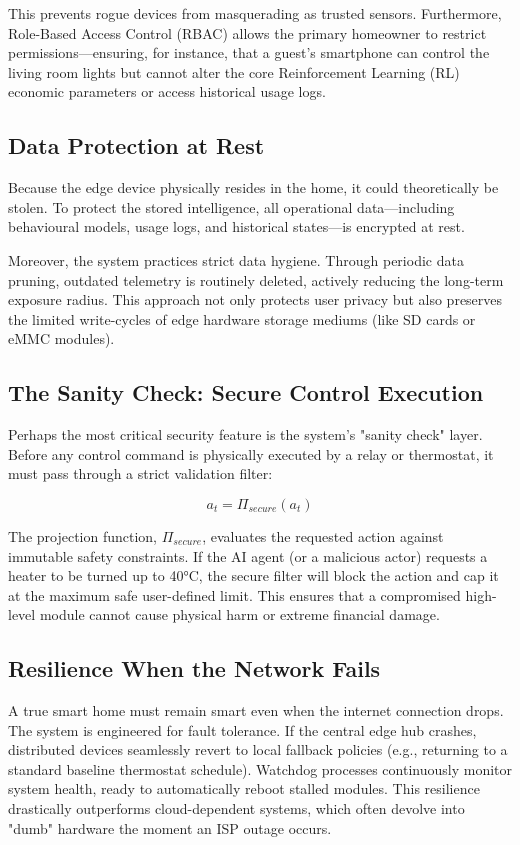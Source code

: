 \documentclass[11pt,a4paper]{article}
\begin{document}
This prevents rogue devices from masquerading as trusted sensors. Furthermore, Role-Based Access Control (RBAC) allows the primary homeowner to restrict permissions---ensuring, for instance, that a guest's smartphone can control the living room lights but cannot alter the core Reinforcement Learning (RL) economic parameters or access historical usage logs.

\subsection{Data Protection at Rest}

Because the edge device physically resides in the home, it could theoretically be stolen. To protect the stored intelligence, all operational data---including behavioural models, usage logs, and historical states---is encrypted at rest.

Moreover, the system practices strict data hygiene. Through periodic data pruning, outdated telemetry is routinely deleted, actively reducing the long-term exposure radius. This approach not only protects user privacy but also preserves the limited write-cycles of edge hardware storage mediums (like SD cards or eMMC modules).

\subsection{The Sanity Check: Secure Control Execution}

Perhaps the most critical security feature is the system's "sanity check" layer. Before any control command is physically executed by a relay or thermostat, it must pass through a strict validation filter:

$$
a_t = \Pi_{secure}(a_t)
$$

The projection function, $\Pi_{secure}$, evaluates the requested action against immutable safety constraints. If the AI agent (or a malicious actor) requests a heater to be turned up to 40°C, the secure filter will block the action and cap it at the maximum safe user-defined limit. This ensures that a compromised high-level module cannot cause physical harm or extreme financial damage.

\subsection{Resilience When the Network Fails}

A true smart home must remain smart even when the internet connection drops. The system is engineered for fault tolerance. If the central edge hub crashes, distributed devices seamlessly revert to local fallback policies (e.g., returning to a standard baseline thermostat schedule). Watchdog processes continuously monitor system health, ready to automatically reboot stalled modules. This resilience drastically outperforms cloud-dependent systems, which often devolve into "dumb" hardware the moment an ISP outage occurs.
\end{document}
